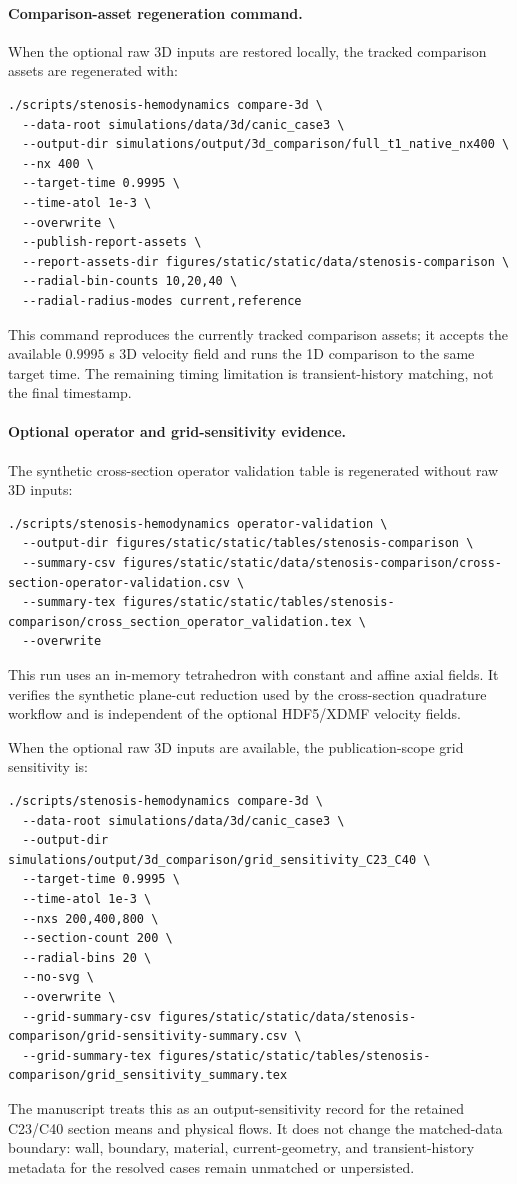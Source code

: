 \paragraph*{Comparison-asset regeneration command.}
When the optional raw 3D inputs are restored locally, the tracked comparison
assets are regenerated with:
\begin{lstlisting}[basicstyle=\ttfamily\footnotesize,breaklines=true]
./scripts/stenosis-hemodynamics compare-3d \
  --data-root simulations/data/3d/canic_case3 \
  --output-dir simulations/output/3d_comparison/full_t1_native_nx400 \
  --nx 400 \
  --target-time 0.9995 \
  --time-atol 1e-3 \
  --overwrite \
  --publish-report-assets \
  --report-assets-dir figures/static/static/data/stenosis-comparison \
  --radial-bin-counts 10,20,40 \
  --radial-radius-modes current,reference
\end{lstlisting}
This command reproduces the currently tracked comparison assets; it accepts the
available $0.9995$ s 3D velocity field and runs the 1D comparison to the same
target time. The remaining timing limitation is transient-history matching, not
the final timestamp.

\paragraph*{Optional operator and grid-sensitivity evidence.}
The synthetic cross-section operator validation table is regenerated without
raw 3D inputs:
\begin{lstlisting}[basicstyle=\ttfamily\footnotesize,breaklines=true]
./scripts/stenosis-hemodynamics operator-validation \
  --output-dir figures/static/static/tables/stenosis-comparison \
  --summary-csv figures/static/static/data/stenosis-comparison/cross-section-operator-validation.csv \
  --summary-tex figures/static/static/tables/stenosis-comparison/cross_section_operator_validation.tex \
  --overwrite
\end{lstlisting}
This run uses an in-memory tetrahedron with constant and affine axial fields.
It verifies the synthetic plane-cut reduction used by the cross-section
quadrature workflow and is independent of the optional HDF5/XDMF velocity
fields.

When the optional raw 3D inputs are available, the publication-scope grid
sensitivity is:
\begin{lstlisting}[basicstyle=\ttfamily\footnotesize,breaklines=true]
./scripts/stenosis-hemodynamics compare-3d \
  --data-root simulations/data/3d/canic_case3 \
  --output-dir simulations/output/3d_comparison/grid_sensitivity_C23_C40 \
  --target-time 0.9995 \
  --time-atol 1e-3 \
  --nxs 200,400,800 \
  --section-count 200 \
  --radial-bins 20 \
  --no-svg \
  --overwrite \
  --grid-summary-csv figures/static/static/data/stenosis-comparison/grid-sensitivity-summary.csv \
  --grid-summary-tex figures/static/static/tables/stenosis-comparison/grid_sensitivity_summary.tex
\end{lstlisting}
The manuscript treats this as an output-sensitivity record for the retained
C23/C40 section means and physical flows. It does not change the matched-data
boundary: wall, boundary, material, current-geometry, and transient-history
metadata for the resolved cases remain unmatched or unpersisted.

